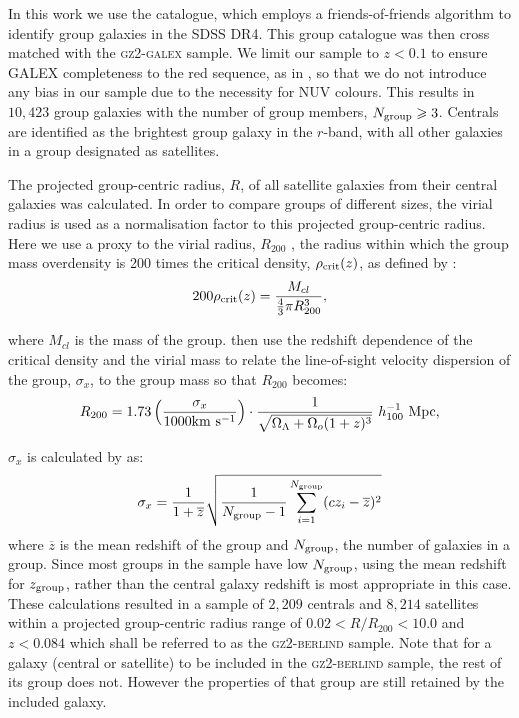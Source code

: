 \documentclass[useAMS,usenatbib]{mn2e}
\begin{document}
In this work we use the \citet{berlind06} catalogue, which employs a friends-of-friends algorithm to identify group galaxies in the SDSS DR4. This group catalogue was then cross matched with the \textsc{gz2-galex} sample. We limit our sample to $z < 0.1$ to ensure GALEX completeness to the red sequence, as in \citealt{wyder07, yesuf14}, so that we do not introduce any bias in our sample due to the necessity for NUV colours. This results in $10,423$ group galaxies with the number of group members, $N_{\rm{group}} \geq 3$. Centrals are identified as the brightest group galaxy in the $r$-band, with all other galaxies in a group designated as satellites.

The projected group-centric radius, $R$, of all satellite galaxies from their central galaxies was calculated. In order to compare groups of different sizes, the virial radius is used as a normalisation factor to this projected group-centric radius. Here we use a proxy to the virial radius, $R_{200}$ \citep[see][]{navarro95}, the radius within which the group mass overdensity is 200 times the critical density, $\rho_{\rm{crit}}(z)$, as defined by \citealt{finn05}:
\begin{equation}\label{eq:overdense}
200\rho_{\rm{crit}}(z) = \frac{M_{cl}}{\frac{4}{3}\pi R_{200}^3},
\end{equation}

where $M_{cl}$ is the mass of the group. \citeauthor{finn05} then use the redshift dependence of the critical density and the virial mass to relate the line-of-sight velocity dispersion of the group, $\sigma_x$, to the group mass so that $R_{200}$ becomes:
\begin{equation}\label{eq:r200}
R_{200} = 1.73 \left ( \frac{\sigma_x}{1000 \rm{km}~\rm{s}^{-1}} \right) \cdot \frac{1}{\sqrt{\Omega_{\Lambda} +\Omega_o(1+z)^3}} ~ h_{100}^{-1} ~\rm{Mpc}, 
\end{equation}

$\sigma_x$ is calculated by \cite{berlind06} as:
\begin{equation}
\sigma_x = \frac{1}{1+\overline{z}} \sqrt{\frac{1}{N_{\rm{group}}-1} \sum_{i=1}^{N_{\rm{group}}}(cz_i - \overline{z})^2}
\end{equation}
where $\overline{z}$ is the mean redshift of the group and $N_{\rm{group}}$, the number of galaxies in a group. Since most groups in the sample have low $N_{\rm{group}}$, using the mean redshift for $z_{\rm{group}}$, rather than the central galaxy redshift is most appropriate in this case. These calculations resulted in a sample of $2,209$ centrals and $8,214$ satellites within a projected group-centric radius range of $0.02 < R/R_{200} < 10.0$ and $z < 0.084$ which shall be referred to as the \textsc{gz2-berlind} sample. Note that for a galaxy (central or satellite) to be included in the \textsc{gz2-berlind} sample, the rest of its group does not. However the properties of that group are still retained by the included galaxy. 
\end{document}
